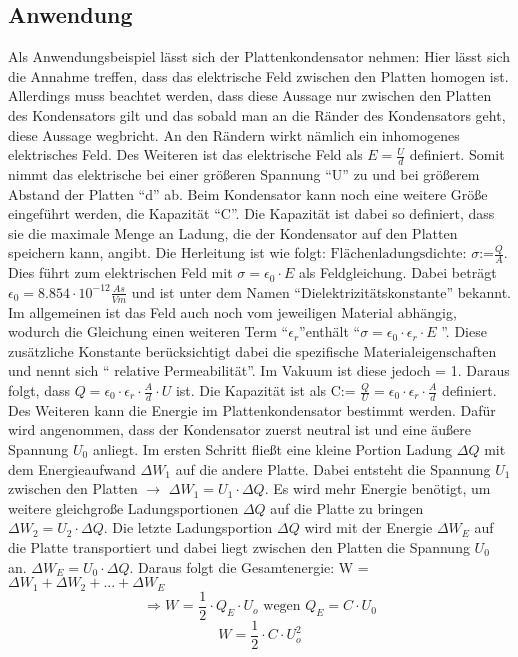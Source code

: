 \subsection{Anwendung}
\label{sec:Plattenkondensator}
Als Anwendungsbeispiel lässt sich der Plattenkondensator nehmen:
Hier lässt sich die Annahme treffen, dass das elektrische Feld zwischen den Platten homogen ist.
Allerdings muss beachtet werden, dass diese Aussage nur zwischen den Platten des Kondensators gilt und das sobald man an die Ränder des Kondensators geht, diese Aussage wegbricht.
An den Rändern wirkt nämlich ein inhomogenes elektrisches Feld.
Des Weiteren ist das elektrische Feld als $E = \frac{U}{d}$ definiert.
Somit nimmt das elektrische bei einer größeren Spannung "`U"' zu und bei größerem Abstand der Platten "`d"' ab.
Beim Kondensator kann noch eine weitere Größe eingeführt werden, die Kapazität "`C"'.
Die Kapazität ist dabei so definiert, dass sie die maximale Menge an Ladung, die der Kondensator auf den Platten speichern kann, angibt.
Die Herleitung ist wie folgt:
$\mbox{Flächenladungsdichte: } \sigma \mbox{:=} \frac{Q}{A}$.
Dies führt zum elektrischen Feld mit $\sigma = \epsilon_0 \cdot E$ als Feldgleichung.
Dabei beträgt $\epsilon_0 = 8.854 \cdot 10^{-12} \frac{As}{Vm}$ und ist unter dem Namen "`Dielektrizitätskonstante"' bekannt.
Im allgemeinen ist das Feld auch noch vom jeweiligen Material abhängig, wodurch die Gleichung einen weiteren Term "`$\epsilon_r$"'enthält "`$\sigma = \epsilon_0 \cdot \epsilon_r \cdot E$ "'.
Diese zusätzliche Konstante berücksichtigt dabei die spezifische Materialeigenschaften und nennt sich "` relative Permeabilität"'.
Im Vakuum ist diese jedoch = 1.
Daraus folgt, dass $ Q = \epsilon_0 \cdot \epsilon_r \cdot \frac{A}{d} \cdot U$ ist.
Die Kapazität ist als $\mbox{C:= } \frac{Q}{U} = \epsilon_0 \cdot \epsilon_r \cdot \frac{A}{d}$ definiert.
Des Weiteren kann die Energie im Plattenkondensator bestimmt werden.
Dafür wird angenommen, dass der Kondensator zuerst neutral ist und eine äußere Spannung $U_0$ anliegt.
Im ersten Schritt fließt eine kleine Portion Ladung $\Delta Q$ mit dem Energieaufwand $\Delta W_1$ auf die andere Platte. Dabei entsteht die Spannung $U_1$ zwischen den Platten $\rightarrow$ $\Delta W_1 = U_1 \cdot \Delta Q$.
Es wird mehr Energie benötigt, um  weitere gleichgroße Ladungsportionen $\Delta Q$ auf die Platte zu bringen $\Delta W_2 = U_2 \cdot \Delta Q$.
Die letzte Ladungsportion $\Delta Q$ wird mit der Energie $\Delta W_E$ auf die Platte transportiert und dabei liegt zwischen den Platten die Spannung $U_0$ an. 
$\Delta W_E = U_0 \cdot \Delta Q$.
Daraus folgt die Gesamtenergie: W = $\Delta W_1 + \Delta W_2 +...+ \Delta W_E$
$$\Rightarrow W \mbox{ = } \frac{1}{2}\cdot Q_E \cdot U_o \mbox{ wegen $Q_E = C \cdot U_0$}$$
$$W= \frac{1}{2} \cdot C \cdot U_o^2$$
